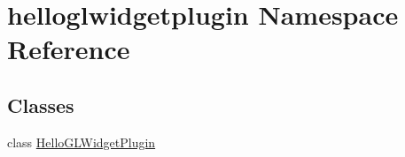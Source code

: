 \hypertarget{namespacehelloglwidgetplugin}{}\section{helloglwidgetplugin Namespace Reference}
\label{namespacehelloglwidgetplugin}
\subsection*{Classes}
\begin{DoxyCompactItemize}
\item 
class \hyperlink{classhelloglwidgetplugin_1_1HelloGLWidgetPlugin}{Hello\+G\+L\+Widget\+Plugin}
\end{DoxyCompactItemize}
